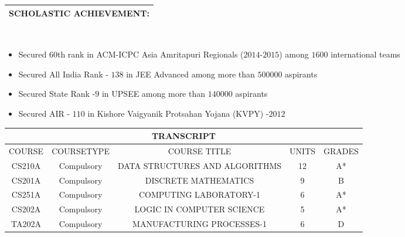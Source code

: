 \documentclass[11pt]{article}
\begin{document}
\begin{tabular}{ccccccc}
\multicolumn{7}{c}{SCHOLASTIC ACHIEVEMENT:}\\
\hline
\end{tabular}
\\
\begin{itemize}
	\item  Secured 60th rank in ACM-ICPC Asia Amritapuri Regionals ($2014$-$2015$) among $1600$ international teams\\
	\item Secured All India Rank - $138$ in JEE Advanced among more than $500000$ aspirants
\item Secured State Rank -$9$ in UPSEE among more than $140000$ aspirants
\item Secured AIR - $110$ in Kishore Vaigyanik Protsahan Yojana (KVPY) -$2012$
\end{itemize}
\begin{tabular}{|c|c|c|c|c|}
\hline
\multicolumn{5}{|c|}{TRANSCRIPT}\\[5pt]
\hline
COURSE & COURSETYPE & COURSE TITLE & UNITS & GRADES\\
\hline
CS210A & Compulsory & DATA STRUCTURES AND ALGORITHMS & 12 & A*\\
\hline
CS201A & Compulsory & DISCRETE MATHEMATICS & 9 & B\\
\hline
CS251A & Compulsory & COMPUTING LABORATORY-1 & 6 & A*\\
\hline
CS202A & Compulsory & LOGIC IN COMPUTER SCIENCE & 5 & A*\\ 
\hline
TA202A & Compulsory & MANUFACTURING PROCESSES-1 & 6 & D\\
\hline
\end{tabular}
\end{document}
